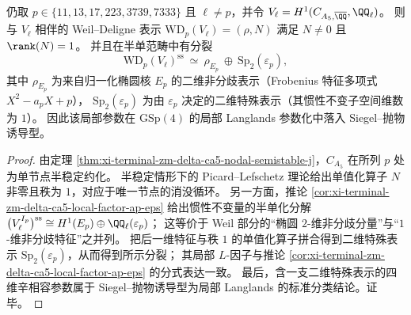 \begin{proposition}\label{prop:xi-terminal-zm-delta-ca5-wd-elliptic-plus-special}
仍取 \(p\in\{11,13,17,223,3739,7333\}\) 且 \(\ell\neq p\)，并令 \(V_\ell=H^1(C_{A_5,\overline{\QQ}},\QQ_\ell)\)。
则与 \(V_\ell\) 相伴的 Weil--Deligne 表示 \(\mathrm{WD}_p(V_\ell)=(\rho,N)\) 满足 \(N\neq 0\) 且 \(\rank(N)=1\)。
并且在半单范畴中有分裂
\[
\mathrm{WD}_p(V_\ell)^{\mathrm{ss}}\ \simeq\ \rho_{E_p}\ \oplus\ \mathrm{Sp}_{2}(\varepsilon_p),
\]
其中 \(\rho_{E_p}\) 为来自归一化椭圆核 \(E_p\) 的二维非分歧表示（Frobenius 特征多项式 \(X^2-a_pX+p\)），
\(\mathrm{Sp}_{2}(\varepsilon_p)\) 为由 \(\varepsilon_p\) 决定的二维特殊表示（其惯性不变子空间维数为 \(1\)）。
因此该局部参数在 \(\mathrm{GSp}(4)\) 的局部 Langlands 参数化中落入 Siegel--抛物诱导型。
\end{proposition}
\begin{proof}
由定理 \ref{thm:xi-terminal-zm-delta-ca5-nodal-semistable-j}，\(C_{A_5}\) 在所列 \(p\) 处为单节点半稳定约化。
半稳定情形下的 Picard--Lefschetz 理论给出单值化算子 \(N\) 非零且秩为 \(1\)，对应于唯一节点的消没循环。
另一方面，推论 \ref{cor:xi-terminal-zm-delta-ca5-local-factor-ap-eps} 给出惯性不变量的半单化分解
\(
\bigl(V_\ell^{I_p}\bigr)^{\mathrm{ss}}\cong H^1(E_p)\oplus \QQ_\ell(\varepsilon_p)
\)；
这等价于 Weil 部分的“椭圆 \(2\)-维非分歧分量”与“\(1\)-维非分歧特征”之并列。
把后一维特征与秩 \(1\) 的单值化算子拼合得到二维特殊表示 \(\mathrm{Sp}_2(\varepsilon_p)\)，从而得到所示分裂；
其局部 \(L\)-因子与推论 \ref{cor:xi-terminal-zm-delta-ca5-local-factor-ap-eps} 的分式表达一致。
最后，含一支二维特殊表示的四维辛相容参数属于 Siegel--抛物诱导型为局部 Langlands 的标准分类结论。证毕。
\end{proof}

